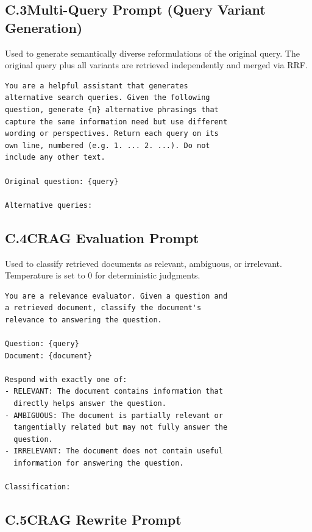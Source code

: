 \documentclass[11pt]{article}
\begin{document}
\subsection*{C.3\quad Multi-Query Prompt (Query Variant Generation)}

Used to generate semantically diverse reformulations of the original query. The original query plus all variants are retrieved independently and merged via RRF.

\begin{small}
\begin{verbatim}
You are a helpful assistant that generates
alternative search queries. Given the following
question, generate {n} alternative phrasings that
capture the same information need but use different
wording or perspectives. Return each query on its
own line, numbered (e.g. 1. ... 2. ...). Do not
include any other text.

Original question: {query}

Alternative queries:
\end{verbatim}
\end{small}

\subsection*{C.4\quad CRAG Evaluation Prompt}

Used to classify retrieved documents as relevant, ambiguous, or irrelevant. Temperature is set to 0 for deterministic judgments.

\begin{small}
\begin{verbatim}
You are a relevance evaluator. Given a question and
a retrieved document, classify the document's
relevance to answering the question.

Question: {query}
Document: {document}

Respond with exactly one of:
- RELEVANT: The document contains information that
  directly helps answer the question.
- AMBIGUOUS: The document is partially relevant or
  tangentially related but may not fully answer the
  question.
- IRRELEVANT: The document does not contain useful
  information for answering the question.

Classification:
\end{verbatim}
\end{small}

\subsection*{C.5\quad CRAG Rewrite Prompt}
\end{document}
